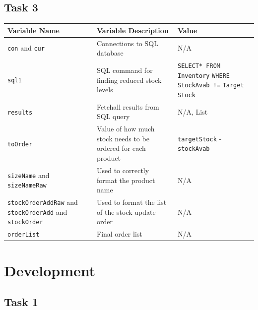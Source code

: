 \documentclass[a4paper]{article}
\begin{document}
\subsection{Task 3}
\begin{center}
\begin{tabular}{ | m{13em} | m{16em}| m{14em} | } 
  \hline
  Variable Name & Variable Description & Value \\ [0.5ex] 
  \hline\hline
  \verb|con| and \verb|cur| & Connections to SQL database & N/A \\
  \hline
  \verb|sql1| & SQL command for finding reduced stock levels & \verb|SELECT* FROM Inventory| \verb|WHERE StockAvab !=| \verb|Target Stock| \\
  \hline
  \verb|results| & Fetchall results from SQL query & N/A, List	\\
  \hline
  \verb|toOrder| & Value of how much stock needs to be ordered for each product & \verb|targetStock| - \verb|stockAvab| \\
  \hline
  \verb|sizeName| and \verb|sizeNameRaw| & Used to correctly format the product name & N/A \\
  \hline
  \verb|stockOrderAddRaw| and \verb|stockOrderAdd| and \verb|stockOrder| & Used to format the list of the stock update order & N/A \\
  \hline
  \verb|orderList| & Final order list & N/A \\
  \hline
  \end{tabular}
\end{center}


\section{Development}
\subsection{Task 1}
\end{document}
